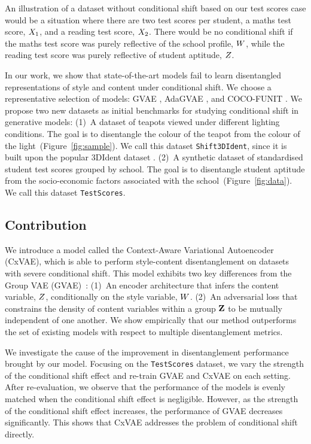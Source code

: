 \documentclass[../thesis.tex]{subfiles}
\begin{document}
An illustration of a dataset without conditional shift based on our test scores case would be a situation where there are two test scores per student, a maths test score, $\myrv{x}_1$, and a reading test score, $\myrv{x}_2$. There would be no conditional shift if the maths test score was purely reflective of the school profile, $\myrv{w}$, while the reading test score was purely reflective of student aptitude, $\myrv{z}$. 

In our work, we show that state-of-the-art models fail to learn disentangled representations of style and content under conditional shift. We choose a representative selection of models: GVAE \citep{bouchacourt2017multi,hosoyaGroupbasedLearningDisentangled2019}, AdaGVAE \citep{locatelloWeaklySupervisedDisentanglementCompromises2020}, and COCO-FUNIT \citep{saitoCOCOFUNITFewShotUnsupervised2020}. We propose two new datasets as initial benchmarks for studying conditional shift in generative models: (1)~A dataset of teapots viewed under different lighting conditions. The goal is to disentangle the colour of the teapot from the colour of the light~(Figure~\ref{fig:sample}). We call this dataset \texttt{Shift3DIdent}, since it is built upon the popular 3DIdent dataset \citep{zimmermannContrastiveLearningInverts2021}. (2)~A synthetic dataset of standardised student test scores grouped by school. The goal is to disentangle student aptitude from the socio-economic factors associated with the school~(Figure~\ref{fig:data}). We call this dataset \texttt{TestScores}.

\subsection{Contribution}

We introduce a model called the Context-Aware Variational Autoencoder (CxVAE), which is able to perform style-content disentanglement on datasets with severe conditional shift. This model exhibits two key differences from the Group VAE (GVAE)~\citep{bouchacourt2017multi,hosoyaGroupbasedLearningDisentangled2019}: (1)~An encoder architecture that infers the content variable, $\myrv{z}$, conditionally on the style variable, $\myrv{w}$. (2)~An adversarial loss that constrains the density of content variables within a group $\mygroup{\myrv{z}}$ to be mutually independent of one another. We show empirically that our method outperforms the set of existing models with respect to multiple disentanglement metrics.

We investigate the cause of the improvement in disentanglement performance brought by our model. Focusing on the \texttt{TestScores} dataset, we vary the strength of the conditional shift effect and re-train GVAE and CxVAE on each setting. After re-evaluation, we observe that the performance of the models is evenly matched when the conditional shift effect is negligible. However, as the strength of the conditional shift effect increases, the performance of GVAE decreases significantly. This shows that CxVAE addresses the problem of conditional shift directly.
\end{document}

